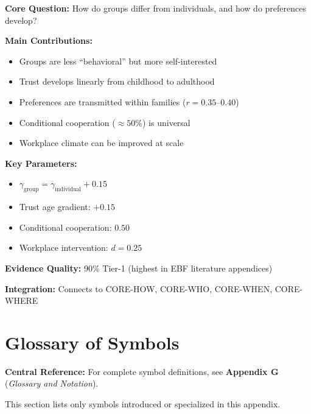 \begin{tcolorbox}[colback=green!10!white, colframe=green!75!black,
    title=\textbf{Appendix SU: Summary}]

\textbf{Core Question:} How do groups differ from individuals, and how do preferences develop?

\textbf{Main Contributions:}
\begin{itemize}[nosep]
    \item Groups are less ``behavioral'' but more self-interested
    \item Trust develops linearly from childhood to adulthood
    \item Preferences are transmitted within families ($r = 0.35$--$0.40$)
    \item Conditional cooperation ($\approx 50\%$) is universal
    \item Workplace climate can be improved at scale
\end{itemize}

\textbf{Key Parameters:}
\begin{itemize}[nosep]
    \item $\gamma_{\text{group}} = \gamma_{\text{individual}} + 0.15$
    \item Trust age gradient: $+0.15$
    \item Conditional cooperation: $0.50$
    \item Workplace intervention: $d = 0.25$
\end{itemize}

\textbf{Evidence Quality:} 90\% Tier-1 (highest in EBF literature appendices)

\textbf{Integration:} Connects to CORE-HOW, CORE-WHO, CORE-WHEN, CORE-WHERE

\end{tcolorbox}


\section{Glossary of Symbols}
\label{sec:su-glossary}

\begin{tcolorbox}[colback=blue!5!white, colframe=blue!75!black]
\textbf{Central Reference:} For complete symbol definitions, see
\textbf{Appendix G} (\textit{Glossary and Notation}).

This section lists only symbols introduced or specialized in this appendix.
\end{tcolorbox}

